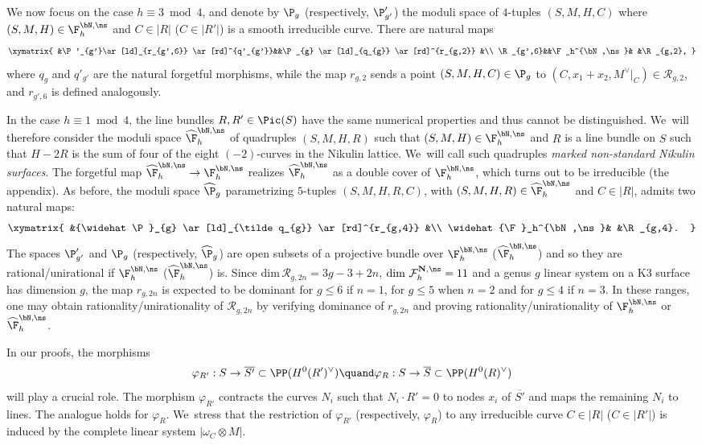 We now focus on the case $h \equiv 3 \bmod 4$, and denote by $\P_{g}$ (respectively, $\P'_{g'}$) the moduli space of $4$-tuples $(S,M,H,C)$ where $(S,M,H)\in \F_h^{\bN,\ns}$ and $C\in |R|$ (\resp $C\in |R'|$) is a smooth irreducible curve. There are natural maps
\[
\xymatrix{
&\P'_{g'}\ar[ld]_{r_{g',6}} \ar[rd]^{q'_{g'}}&&\P_{g} \ar[ld]_{q_{g}} \ar[rd]^{r_{g,2}} &\\
\R_{g',6}&&\F_h^{\bN,\ns}& &\R_{g,2},
}
\]
where $q_{g}$ and $q'_{g'}$ are the natural forgetful morphisms, while the map $r_{g,2}$ sends a point \linebreak $(S,M,H,C)\in \P_{g}$ to $(C,x_1+x_2,M^\vee|_C)\in \mathcal R_{g,2}$, and $r_{g',6}$ is defined analogously.

In the case $h \equiv 1 \bmod 4$, the line bundles $R,R'\in \Pic(S)$ have the same numerical properties and thus cannot be distinguished. We~will therefore consider the moduli space $\widehat{\F}_h^{\bN,\ns}$ of quadruples $(S,M,H,R)$ such that $(S,M,H) \in \F_h^{\bN,\ns}$ and $R$ is a line bundle on $S$ such that $H-2R$ is the sum of four of the eight $(-2)$-curves in the Nikulin lattice. We~will call such quadruples {\it marked non-standard Nikulin surfaces}.
The forgetful map $\widehat{\F}_h^{\bN,\ns} \to \F_h^{\bN,\ns}$ realizes $\widehat{\F}_h^{\bN,\ns}$ as a double cover of $\F_h^{\bN,\ns}$, which turns out to be irreducible (\cf the appendix). As before, the moduli space ${\widehat\P}_{g}$ parametrizing $5$-tuples $(S,M,H,R,C)$, with $(S,M,H,R)\in \widehat{\F}_h^{\bN,\ns}$ and $C\in |R|$, admits two natural maps:
\[
\xymatrix{
&{\widehat\P}_{g} \ar[ld]_{\tilde q_{g}} \ar[rd]^{r_{g,4}} &\\
\widehat{\F}_h^{\bN,\ns}& &\R_{g,4}.
}
\]
The spaces $\P'_{g'}$ and $\P_{g}$ (respectively, ${\widehat\P}_{g}$) are open subsets of a projective bundle over $\F_h^{\bN,\ns}$ (\resp $\widehat{\F}_h^{\bN,\ns}$) and so they are rational/unirational if $\F_h^{\bN,\ns}$ (\resp $\widehat{\F}_h^{\bN,\ns}$) is. Since $\mathrm{dim}\,\mathcal R_{g,2n}=3g-3+2n$, $\dim\,\mathcal F_h^{\mathbf N,\ns} =11$ and a genus $g$ linear system on a K3 surface has dimension $g$, the map $r_{g,2n}$ is expected to be dominant for $g\leq 6$ if $n=1$, for $g\leq 5$ when $n=2$ and for $g\leq 4$ if $n=3$. In these ranges, one may obtain rationality/unirationality of $\mathcal R_{g,2n}$ by verifying dominance of $r_{g,2n}$ and proving rationality/unirationality of $\F_h^{\bN,\ns}$ or $\widehat{\F}_h^{\bN,\ns}$.

In our proofs, the morphisms
\[
\varphi_{R'}:S\to \overline{S'}\subset \PP(H^0(R')^\vee)
\quand
\varphi_{R}:S\to \overline{S}\subset \PP(H^0(R)^\vee)
\]
will play a crucial role. The morphism $\varphi_{R'}$ contracts the curves $N_i$ such that $N_i\cdot R'=0$ to nodes $x_i$ of $\overline{S'}$ and maps the remaining $N_i$ to lines. The analogue holds for $\varphi_{R}$. We~stress that the restriction of $\varphi_{R'}$ (respectively, $\varphi_{R}$) to any irreducible curve $C\in |R|$ (\resp $C\in |R'|$) is induced by the complete linear system $\vert \omega_C\otimes M\vert$.

